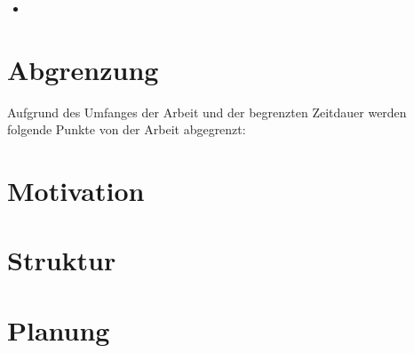 \begin{itemize}
\item 
\end{itemize}


\section{Abgrenzung} \label{sec:Abgrenzung}
Aufgrund des Umfanges der Arbeit und der begrenzten Zeitdauer werden folgende Punkte von der Arbeit abgegrenzt:

\begin{itemize}

\end{itemize}


\section{Motivation}

\section{Struktur}


\section{Planung} \label{sec:Intro:Planning}
